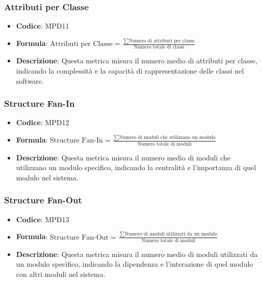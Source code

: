 \documentclass[a4paper, 11pt]{article}
\begin{document}
\subsubsection{Attributi per Classe}
\begin{itemize}
    \item \textbf{Codice}: MPD11
    \item \textbf{Formula}: $\displaystyle \text{Attributi per Classe} = \frac{\sum \text{Numero di attributi per classe}}{\text{Numero totale di classi}}$
    \item \textbf{Descrizione}: Questa metrica misura il numero medio di attributi per classe, indicando la complessità e la capacità di rappresentazione delle classi nel software.
\end{itemize}
\subsubsection{Structure Fan-In}
\begin{itemize}
    \item \textbf{Codice}: MPD12
    \item \textbf{Formula}: $\displaystyle \text{Structure Fan-In} = \frac{\sum \text{Numero di moduli che utilizzano un modulo}}{\text{Numero totale di moduli}}$
    \item \textbf{Descrizione}: Questa metrica misura il numero medio di moduli che utilizzano un modulo specifico, indicando la centralità e l'importanza di quel modulo nel sistema.
\end{itemize}
\subsubsection{Structure Fan-Out}
\begin{itemize}
    \item \textbf{Codice}: MPD13
    \item \textbf{Formula}: $\displaystyle \text{Structure Fan-Out} = \frac{\sum \text{Numero di moduli utilizzati da un modulo}}{\text{Numero totale di moduli}}$
    \item \textbf{Descrizione}: Questa metrica misura il numero medio di moduli utilizzati da un modulo specifico, indicando la dipendenza e l'interazione di quel modulo con altri moduli nel sistema.
\end{itemize}
\end{document}
